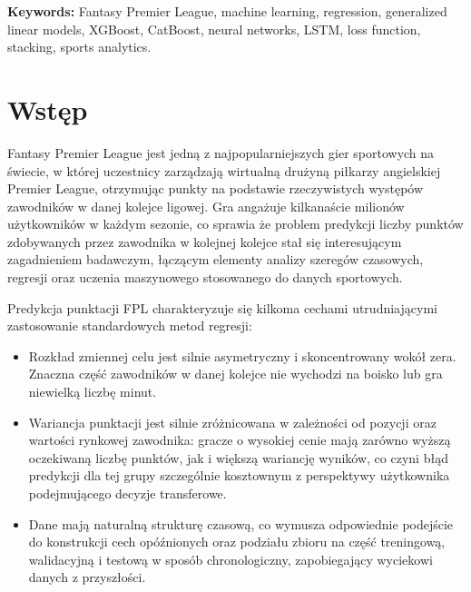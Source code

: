 \documentclass[a4paper,twoside,11pt]{mwrep}
\theoremstyle{plain} \newtheorem{thm}{Twierdzenie}
\theoremstyle{plain} \newtheorem{lem}{Lemat}
\theoremstyle{definition} \newtheorem{defn}{Definicja}
\theoremstyle{remark} \newtheorem*{rem}{Wniosek}
\begin{document}
\medskip
\noindent\textbf{Keywords:} Fantasy Premier League, machine learning,
regression, generalized linear models, XGBoost, CatBoost, neural
networks, LSTM, loss function, stacking, sports analytics.

\tableofcontents
\setcounter{page}{1}

\chapter*{Wstęp}

Fantasy Premier League jest jedną z najpopularniejszych gier sportowych na świecie, w której uczestnicy zarządzają wirtualną
drużyną piłkarzy angielskiej Premier League, otrzymując punkty na podstawie
rzeczywistych występów zawodników w danej kolejce ligowej. Gra angażuje kilkanaście milionów użytkowników w każdym sezonie, co sprawia że problem predykcji liczby punktów zdobywanych przez zawodnika w kolejnej
kolejce stał się interesującym zagadnieniem badawczym,
łączącym elementy analizy szeregów czasowych, regresji oraz uczenia maszynowego
stosowanego do danych sportowych.

Predykcja punktacji FPL charakteryzuje się kilkoma cechami utrudniającymi
zastosowanie standardowych metod regresji:
\begin{itemize}
    \item Rozkład zmiennej celu jest silnie asymetryczny i skoncentrowany
    wokół zera. Znaczna część zawodników w danej kolejce nie wychodzi na
    boisko lub gra niewielką liczbę minut.
    \item Wariancja punktacji jest silnie zróżnicowana w zależności od
    pozycji oraz wartości rynkowej zawodnika: gracze o wysokiej cenie mają
    zarówno wyższą oczekiwaną liczbę punktów, jak i większą wariancję
    wyników, co czyni błąd predykcji dla tej grupy szczególnie kosztownym
    z perspektywy użytkownika podejmującego decyzje transferowe.
    \item Dane mają naturalną strukturę czasową, co wymusza odpowiednie
    podejście do konstrukcji cech opóźnionych oraz podziału zbioru na
    część treningową, walidacyjną i testową w sposób chronologiczny,
    zapobiegający wyciekowi danych z przyszłości.
\end{itemize}
\end{document}
